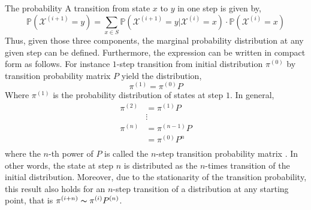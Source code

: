 The probability A transition from state $x$ to $y$ in one step is given by,
\begin{equation}
	\mathbb{P}(\mathcal{X}^{(i+1)} = y) = \sum_{x \in S} \mathbb{P}(\mathcal{X}^{(i+1)} = y | \mathcal{X}^{(i)} = x) \cdot \mathbb{P}(\mathcal{X}^{(i)} = x)
\label{eq:app_markov_chain_one_step}
\end{equation}
Thus, given those three components, the marginal probability distribution at any given step can be defined.
Furthermore, the expression can be written in compact form as follows.
For instance $1$-step transition from initial distribution $\pi^{(0)}$ by transition probability matrix $P$ yield the distribution,
\begin{equation}
	\pi^{(1)} = \pi^{(0)} P
\label{eq:app_markov_chain_one_step}
\end{equation}
Where $\pi^{(1)}$ is the probability distribution of states at step $1$.
In general,
\begin{equation}
	\begin{split}
		\pi^{(2)} & = \pi^{(1)} P \\
		          & \vdots \\
		\pi^{(n)} & = \pi^{(n-1)} P \\
		          & = \pi^{(0)} P^n\\
	\end{split}
\label{eq:app_markov_chain_one_step}
\end{equation}
where the $n$-th power of $P$ is called the $n$-step transition probability matrix \cite{Sokal1997}.
In other words, the state at step $n$ is distributed as the $n$-times transition of the initial distribution.
Moreover, due to the stationarity of the transition probability,
this result also holds for an $n$-step transition of a distribution at any starting point,
that is $\pi^{(i+n)} \thicksim \pi^{(i)} P^{(n)}$.  

